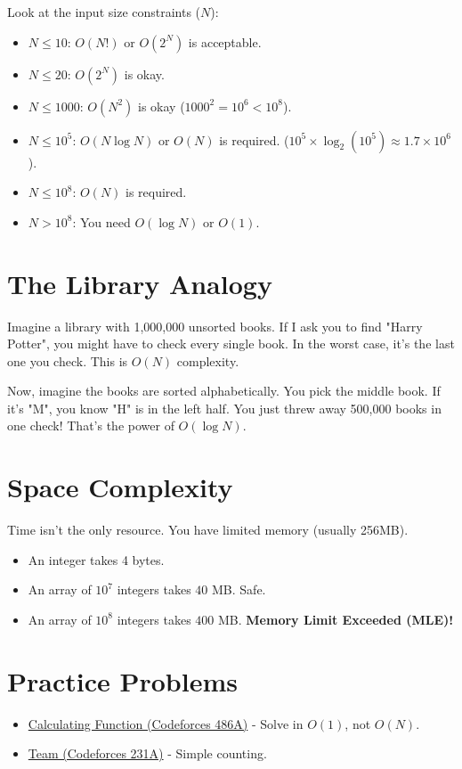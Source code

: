 \documentclass[12pt, a4paper]{report}
\begin{document}
Look at the input size constraints ($N$):
\begin{itemize}
    \item $N \le 10$: $O(N!)$ or $O(2^N)$ is acceptable.
    \item $N \le 20$: $O(2^N)$ is okay.
    \item $N \le 1000$: $O(N^2)$ is okay ($1000^2 = 10^6 < 10^8$).
    \item $N \le 10^5$: $O(N \log N)$ or $O(N)$ is required. ($10^5 \times \log_2(10^5) \approx 1.7 \times 10^6$).
    \item $N \le 10^8$: $O(N)$ is required.
    \item $N > 10^8$: You need $O(\log N)$ or $O(1)$.
\end{itemize}

\section{The Library Analogy}
Imagine a library with 1,000,000 unsorted books. If I ask you to find "Harry Potter", you might have to check every single book. In the worst case, it's the last one you check. This is $O(N)$ complexity.

Now, imagine the books are sorted alphabetically. You pick the middle book. If it's "M", you know "H" is in the left half. You just threw away 500,000 books in one check! That's the power of $O(\log N)$.

\section{Space Complexity}
Time isn't the only resource. You have limited memory (usually 256MB).
\begin{itemize}
    \item An integer takes 4 bytes.
    \item An array of $10^7$ integers takes $40$ MB. Safe.
    \item An array of $10^8$ integers takes $400$ MB. \textbf{Memory Limit Exceeded (MLE)!}
\end{itemize}

\section{Practice Problems}
\begin{itemize}
    \item \href{https://codeforces.com/problemset/problem/486/A}{Calculating Function (Codeforces 486A)} - Solve in $O(1)$, not $O(N)$.
    \item \href{https://codeforces.com/problemset/problem/231/A}{Team (Codeforces 231A)} - Simple counting.
\end{itemize}
\end{document}
